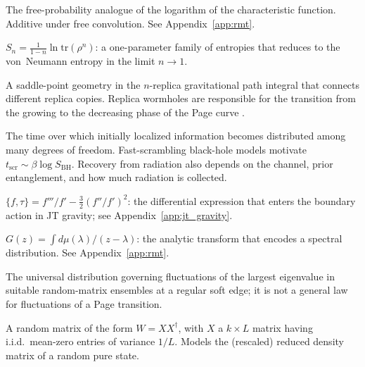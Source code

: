 \documentclass[11pt,letterpaper]{article}
\theoremstyle{plain}
\theoremstyle{definition}
\theoremstyle{remark}
\begin{document}
\begin{description}[style=nextline, leftmargin=2.5cm, labelwidth=2.3cm]
\item[$R$-transform]
The free-probability analogue of the logarithm of the characteristic function.
Additive under free convolution.  See Appendix~\ref{app:rmt}.

\item[R\'enyi entropy]
$S_n = \frac{1}{1-n}\ln\mathrm{tr}(\rho^n)$: a one-parameter family of
entropies that reduces to the von~Neumann entropy in the limit $n \to 1$.

\item[Replica wormhole]
A saddle-point geometry in the $n$-replica gravitational path integral that
connects different replica copies.  Replica wormholes are responsible for
the transition from the growing to the decreasing phase of the Page curve
\cite{pssyetal2022}.

\item[Scrambling time]
The time over which initially localized information becomes distributed among
many degrees of freedom.  Fast-scrambling black-hole models motivate
$t_{\mathrm{scr}}\sim\beta\log S_{\mathrm{BH}}$.  Recovery from radiation
also depends on the channel, prior entanglement, and how much radiation is collected.

\item[Schwarzian derivative]
$\{f,\tau\} = f'''/f' - \frac{3}{2}(f''/f')^2$: the differential expression
that enters the boundary action in JT gravity; see Appendix~\ref{app:jt_gravity}.

\item[Stieltjes transform]
$G(z) = \int d\mu(\lambda)/(z-\lambda)$: the analytic transform that encodes
a spectral distribution.  See Appendix~\ref{app:rmt}.

\item[Tracy--Widom distribution]
The universal distribution governing fluctuations of the largest eigenvalue
in suitable random-matrix ensembles at a regular soft edge; it is not a
general law for fluctuations of a Page transition.

\item[Wishart matrix]
A random matrix of the form $W = XX^{\dagger}$, with $X$ a $k \times L$
matrix having i.i.d.\ mean-zero entries of variance $1/L$.  Models the
(rescaled) reduced density matrix of a random pure state.

\end{description}
\end{document}
